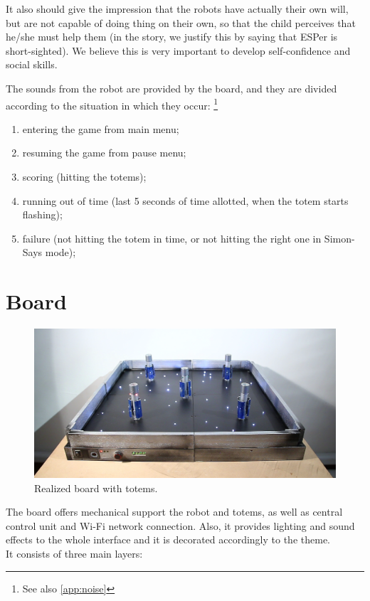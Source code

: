 \documentclass[a4paper,twoside]{book}
\begin{document}
It also should give the impression that the robots have actually their own will, but are not capable of doing thing on their own, so that the child perceives that he/she must help them (in the story, we justify this by saying that ESPer is short-sighted). We believe this is very important to develop self-confidence and social skills.

The sounds from the robot are provided by the board, and they are divided according to the situation in which they occur:
\footnote{See also \autoref{app:noise}}

\begin{enumerate}
\item entering the game from main menu;
\item resuming the game from pause menu;
\item scoring (hitting the totems);
\item running out of time (last 5 seconds of time allotted, when the totem starts flashing);
\item failure (not hitting the totem in time, or not hitting the right one in Simon-Says mode);
\end{enumerate}


\section{Board}

\begin{figure}[h]
\includegraphics[width=\linewidth]{img/IMG_20160616_111353} 
\caption{Realized board with totems.}
\end{figure}

The board offers mechanical support the robot and totems, as well as central control unit and Wi-Fi network connection. Also, it provides lighting and sound effects to the whole interface and it is decorated accordingly to the theme.
\\
It consists of three main layers:
\end{document}
